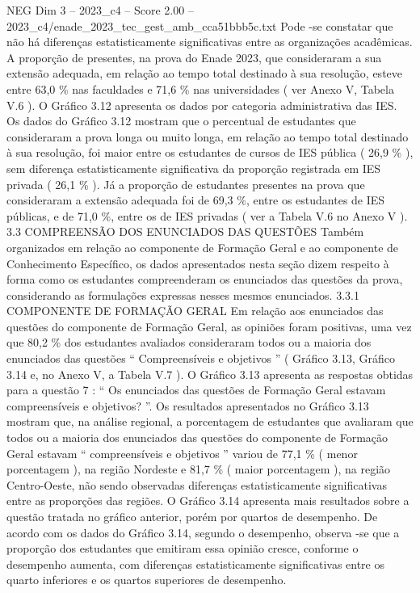 \begin{textsample}{NEG Dim 3 – 2023\_c4 – Score 2.00 – 2023\_c4/enade\_2023\_tec\_gest\_amb\_cca51bbb5c.txt}
Pode -se constatar que não há diferenças estatisticamente significativas entre as organizações acadêmicas.
A proporção de presentes, na prova do Enade 2023, que consideraram a sua extensão adequada, em relação ao tempo total destinado à sua resolução, esteve entre 63,0 \% nas faculdades e 71,6 \% nas universidades ( ver Anexo V, Tabela V.6 ).
O Gráfico 3.12 apresenta os dados por categoria administrativa das IES.
Os dados do Gráfico 3.12 mostram que o percentual de estudantes que consideraram a prova longa ou muito longa, em relação ao tempo total destinado à sua resolução, foi maior entre os estudantes de cursos de IES pública ( 26,9 \% ), sem diferença estatisticamente significativa da proporção registrada em IES privada ( 26,1 \% ).
Já a proporção de estudantes presentes na prova que consideraram a extensão adequada foi de 69,3 \%, entre os estudantes de IES públicas, e de 71,0 \%, entre os de IES privadas ( ver a Tabela V.6 no Anexo V ). 3.3 COMPREENSÃO DOS ENUNCIADOS DAS QUESTÕES Também organizados em relação ao componente de Formação Geral e ao componente de Conhecimento Específico, os dados apresentados nesta seção dizem respeito à forma como os estudantes compreenderam os enunciados das questões da prova, considerando as formulações expressas nesses mesmos enunciados. 3.3.1 COMPONENTE DE FORMAÇÃO GERAL Em relação aos enunciados das questões do componente de Formação Geral, as opiniões foram positivas, uma vez que 80,2 \% dos estudantes avaliados consideraram todos ou a maioria dos enunciados das questões “ Compreensíveis e objetivos ” ( Gráfico 3.13, Gráfico 3.14 e, no Anexo V, a Tabela V.7 ).
O Gráfico 3.13 apresenta as respostas obtidas para a questão 7 : “ Os enunciados das questões de Formação Geral estavam compreensíveis e objetivos? ”.
Os resultados apresentados no Gráfico 3.13 mostram que, na análise regional, a porcentagem de estudantes que avaliaram que todos ou a maioria dos enunciados das questões do componente de Formação Geral estavam “ compreensíveis e objetivos ” variou de 77,1 \% ( menor porcentagem ), na região Nordeste e 81,7 \% ( maior porcentagem ), na região Centro-Oeste, não sendo observadas diferenças estatisticamente significativas entre as proporções das regiões.
O Gráfico 3.14 apresenta mais resultados sobre a questão tratada no gráfico anterior, porém por quartos de desempenho.
De acordo com os dados do Gráfico 3.14, segundo o desempenho, observa -se que a proporção dos estudantes que emitiram essa opinião cresce, conforme o desempenho aumenta, com diferenças estatisticamente significativas entre os quarto inferiores e os quartos superiores de desempenho.

\end{textsample}
